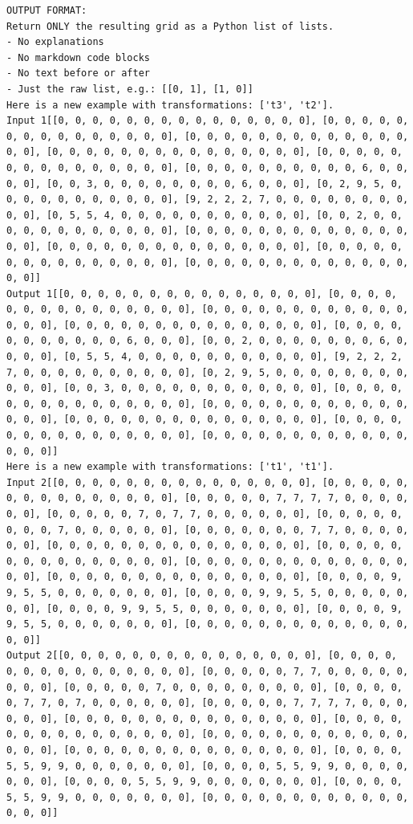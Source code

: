 \begin{lstlisting}
OUTPUT FORMAT:
Return ONLY the resulting grid as a Python list of lists.
- No explanations
- No markdown code blocks
- No text before or after
- Just the raw list, e.g.: [[0, 1], [1, 0]]
Here is a new example with transformations: ['t3', 't2'].
Input 1[[0, 0, 0, 0, 0, 0, 0, 0, 0, 0, 0, 0, 0, 0, 0], [0, 0, 0, 0, 0, 0, 0, 0, 0, 0, 0, 0, 0, 0, 0], [0, 0, 0, 0, 0, 0, 0, 0, 0, 0, 0, 0, 0, 0, 0], [0, 0, 0, 0, 0, 0, 0, 0, 0, 0, 0, 0, 0, 0, 0], [0, 0, 0, 0, 0, 0, 0, 0, 0, 0, 0, 0, 0, 0, 0], [0, 0, 0, 0, 0, 0, 0, 0, 0, 0, 6, 0, 0, 0, 0], [0, 0, 3, 0, 0, 0, 0, 0, 0, 0, 0, 6, 0, 0, 0], [0, 2, 9, 5, 0, 0, 0, 0, 0, 0, 0, 0, 0, 0, 0], [9, 2, 2, 2, 7, 0, 0, 0, 0, 0, 0, 0, 0, 0, 0], [0, 5, 5, 4, 0, 0, 0, 0, 0, 0, 0, 0, 0, 0, 0], [0, 0, 2, 0, 0, 0, 0, 0, 0, 0, 0, 0, 0, 0, 0], [0, 0, 0, 0, 0, 0, 0, 0, 0, 0, 0, 0, 0, 0, 0], [0, 0, 0, 0, 0, 0, 0, 0, 0, 0, 0, 0, 0, 0, 0], [0, 0, 0, 0, 0, 0, 0, 0, 0, 0, 0, 0, 0, 0, 0], [0, 0, 0, 0, 0, 0, 0, 0, 0, 0, 0, 0, 0, 0, 0]]
Output 1[[0, 0, 0, 0, 0, 0, 0, 0, 0, 0, 0, 0, 0, 0, 0], [0, 0, 0, 0, 0, 0, 0, 0, 0, 0, 0, 0, 0, 0, 0], [0, 0, 0, 0, 0, 0, 0, 0, 0, 0, 0, 0, 0, 0, 0], [0, 0, 0, 0, 0, 0, 0, 0, 0, 0, 0, 0, 0, 0, 0], [0, 0, 0, 0, 0, 0, 0, 0, 0, 0, 0, 6, 0, 0, 0], [0, 0, 2, 0, 0, 0, 0, 0, 0, 0, 6, 0, 0, 0, 0], [0, 5, 5, 4, 0, 0, 0, 0, 0, 0, 0, 0, 0, 0, 0], [9, 2, 2, 2, 7, 0, 0, 0, 0, 0, 0, 0, 0, 0, 0], [0, 2, 9, 5, 0, 0, 0, 0, 0, 0, 0, 0, 0, 0, 0], [0, 0, 3, 0, 0, 0, 0, 0, 0, 0, 0, 0, 0, 0, 0], [0, 0, 0, 0, 0, 0, 0, 0, 0, 0, 0, 0, 0, 0, 0], [0, 0, 0, 0, 0, 0, 0, 0, 0, 0, 0, 0, 0, 0, 0], [0, 0, 0, 0, 0, 0, 0, 0, 0, 0, 0, 0, 0, 0, 0], [0, 0, 0, 0, 0, 0, 0, 0, 0, 0, 0, 0, 0, 0, 0], [0, 0, 0, 0, 0, 0, 0, 0, 0, 0, 0, 0, 0, 0, 0]]
Here is a new example with transformations: ['t1', 't1'].
Input 2[[0, 0, 0, 0, 0, 0, 0, 0, 0, 0, 0, 0, 0, 0, 0], [0, 0, 0, 0, 0, 0, 0, 0, 0, 0, 0, 0, 0, 0, 0], [0, 0, 0, 0, 0, 7, 7, 7, 7, 0, 0, 0, 0, 0, 0], [0, 0, 0, 0, 0, 7, 0, 7, 7, 0, 0, 0, 0, 0, 0], [0, 0, 0, 0, 0, 0, 0, 0, 7, 0, 0, 0, 0, 0, 0], [0, 0, 0, 0, 0, 0, 0, 7, 7, 0, 0, 0, 0, 0, 0], [0, 0, 0, 0, 0, 0, 0, 0, 0, 0, 0, 0, 0, 0, 0], [0, 0, 0, 0, 0, 0, 0, 0, 0, 0, 0, 0, 0, 0, 0], [0, 0, 0, 0, 0, 0, 0, 0, 0, 0, 0, 0, 0, 0, 0], [0, 0, 0, 0, 0, 0, 0, 0, 0, 0, 0, 0, 0, 0, 0], [0, 0, 0, 0, 9, 9, 5, 5, 0, 0, 0, 0, 0, 0, 0], [0, 0, 0, 0, 9, 9, 5, 5, 0, 0, 0, 0, 0, 0, 0], [0, 0, 0, 0, 9, 9, 5, 5, 0, 0, 0, 0, 0, 0, 0], [0, 0, 0, 0, 9, 9, 5, 5, 0, 0, 0, 0, 0, 0, 0], [0, 0, 0, 0, 0, 0, 0, 0, 0, 0, 0, 0, 0, 0, 0]]
Output 2[[0, 0, 0, 0, 0, 0, 0, 0, 0, 0, 0, 0, 0, 0, 0], [0, 0, 0, 0, 0, 0, 0, 0, 0, 0, 0, 0, 0, 0, 0], [0, 0, 0, 0, 0, 7, 7, 0, 0, 0, 0, 0, 0, 0, 0], [0, 0, 0, 0, 0, 7, 0, 0, 0, 0, 0, 0, 0, 0, 0], [0, 0, 0, 0, 0, 7, 7, 0, 7, 0, 0, 0, 0, 0, 0], [0, 0, 0, 0, 0, 7, 7, 7, 7, 0, 0, 0, 0, 0, 0], [0, 0, 0, 0, 0, 0, 0, 0, 0, 0, 0, 0, 0, 0, 0], [0, 0, 0, 0, 0, 0, 0, 0, 0, 0, 0, 0, 0, 0, 0], [0, 0, 0, 0, 0, 0, 0, 0, 0, 0, 0, 0, 0, 0, 0], [0, 0, 0, 0, 0, 0, 0, 0, 0, 0, 0, 0, 0, 0, 0], [0, 0, 0, 0, 5, 5, 9, 9, 0, 0, 0, 0, 0, 0, 0], [0, 0, 0, 0, 5, 5, 9, 9, 0, 0, 0, 0, 0, 0, 0], [0, 0, 0, 0, 5, 5, 9, 9, 0, 0, 0, 0, 0, 0, 0], [0, 0, 0, 0, 5, 5, 9, 9, 0, 0, 0, 0, 0, 0, 0], [0, 0, 0, 0, 0, 0, 0, 0, 0, 0, 0, 0, 0, 0, 0]]

\end{lstlisting}
